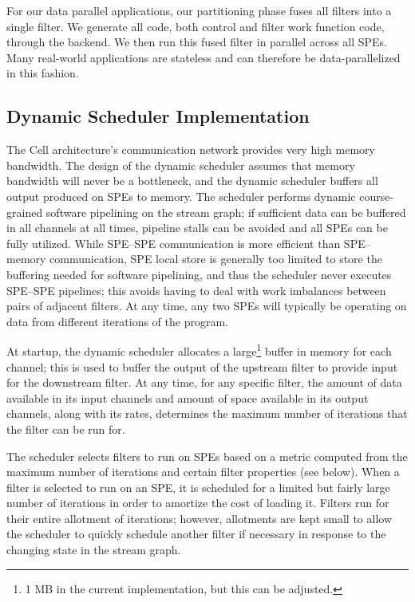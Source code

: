 For our data parallel applications, our partitioning
phase fuses all filters into a single filter. We generate all code, both control and
filter work function code, through the backend. We then run this fused filter
in parallel across all SPEs. Many real-world applications are stateless and can
therefore be data-parallelized in this fashion.



\subsection{Dynamic Scheduler Implementation}\label{ch:ds:imp}

The Cell architecture's communication network provides very high
memory bandwidth. The design of the dynamic scheduler assumes that
memory bandwidth will never be a bottleneck, and the dynamic scheduler
buffers all output produced on SPEs to memory. The scheduler performs
dynamic course-grained software pipelining on the stream graph; if
sufficient data can be buffered in all channels at all times, pipeline
stalls can be avoided and all SPEs can be fully utilized. While
SPE--SPE communication is more efficient than SPE--memory
communication, SPE local store is generally too limited to store the
buffering needed for software pipelining, and thus the scheduler never
executes SPE--SPE pipelines; this avoids having to deal with work
imbalances between pairs of adjacent filters. At any time, any two
SPEs will typically be operating on data from different 
iterations of the program.

At startup, the dynamic scheduler allocates a large\footnote{1 MB in
the current implementation, but this can be adjusted.} buffer in
memory for each channel; this is used to buffer the output of the
upstream filter to provide input for the downstream filter. At any
time, for any specific filter, the amount of data available in its
input channels and amount of space available in its output channels,
along with its rates, determines the maximum number of iterations that
the filter can be run for.

The scheduler selects filters to run on SPEs based on a metric
computed from the maximum number of iterations and certain filter
properties (see below). When a filter is selected to run on an SPE, it
is scheduled for a limited but fairly large number of iterations in
order to amortize the cost of loading it. Filters run for their entire
allotment of iterations; however, allotments are kept small to allow
the scheduler to quickly schedule another filter if necessary in
response to the changing state in the stream graph.

